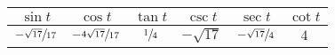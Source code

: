 \documentclass{exam}
\begin{document}
\begin{description}
        \begin{tabular}[H]{cccccc}
          \toprule
          $\sin t$                & $\cos t$                  & $\tan t$      & $\csc t$     & $\sec t$               & $\cot t$ \\
          \midrule
          $-\sfrac{\sqrt{17}}{17}$ & $-\sfrac{4 \sqrt{17}}{17}$ & $\sfrac{1}{4}$ & $-\sqrt{17}$ & $-\sfrac{\sqrt{17}}{4}$ & $4$ \\
          \bottomrule
        \end{tabular}








\end{description}
\end{document}
